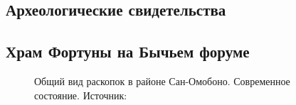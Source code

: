 \begin{appendices}
\chapter{Археологические свидетельства}

\section{Храм Фортуны на Бычьем форуме}\label{appendix:InForoBoario}

\begin{figure}[ht!]
\caption{Общий вид раскопок в районе Сан-Омобоно. Современное состояние. \footnotesize{Источник: \cite[URL: \href{http://intarch.ac.uk/journal/issue31/1/images/figure1.html}{http://intarch.ac.uk/journal/issue31/1/images/figure1.html}]{Terrenato2012}}
}\label{pic:SOmobono1}
\end{figure}


\end{appendices}
